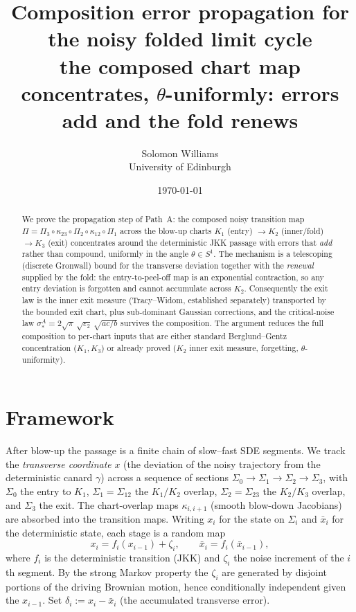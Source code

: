 \documentclass[11pt]{article}
\title{\textbf{Composition error propagation for the noisy folded limit cycle}\\[2pt]
\large the composed chart map concentrates, $\theta$-uniformly: errors add and the fold
renews}
\author{Solomon Williams \\ \small University of Edinburgh}
\date{\today}
\theoremstyle{definition}
\theoremstyle{remark}
\begin{document}
\maketitle

\begin{abstract}\noindent
We prove the propagation step of Path~A: the composed noisy transition map
$\Pi=\Pi_3\circ\kappa_{23}\circ\Pi_2\circ\kappa_{12}\circ\Pi_1$ across the blow-up charts
$K_1$ (entry) $\to K_2$ (inner/fold) $\to K_3$ (exit) concentrates around the
deterministic JKK passage with errors that \emph{add} rather than compound, uniformly in
the angle $\theta\in S^1$. The mechanism is a telescoping (discrete Gronwall) bound for
the transverse deviation together with the \emph{renewal} supplied by the fold: the
entry-to-peel-off map is an exponential contraction, so any entry deviation is forgotten
and cannot accumulate across $K_2$. Consequently the exit law is the inner exit measure
(Tracy--Widom, established separately) transported by the bounded exit chart, plus
sub-dominant Gaussian corrections, and the critical-noise law
$\sigma_*^A=2\sqrt\pi\,\sqrt{\varepsilon_2}\,\sqrt{ac/b}$ survives the composition. The
argument reduces the full composition to per-chart inputs that are either standard
Berglund--Gentz concentration ($K_1,K_3$) or already proved ($K_2$ inner exit measure,
forgetting, $\theta$-uniformity).
\end{abstract}

\section{Framework}

After blow-up the passage is a finite chain of slow--fast SDE segments. We track the
\emph{transverse coordinate} $x$ (the deviation of the noisy trajectory from the
deterministic canard $\gamma$) across a sequence of sections
$\Sigma_0\to\Sigma_1\to\Sigma_2\to\Sigma_3$, with $\Sigma_0$ the entry to $K_1$,
$\Sigma_1=\Sigma_{12}$ the $K_1/K_2$ overlap, $\Sigma_2=\Sigma_{23}$ the $K_2/K_3$
overlap, and $\Sigma_3$ the exit. The chart-overlap maps $\kappa_{i,i+1}$ (smooth
blow-down Jacobians) are absorbed into the transition maps. Writing $x_i$ for the state
on $\Sigma_i$ and $\bar x_i$ for the deterministic state, each stage is a random map
\begin{equation}\label{eq:stage}
  x_i=f_i(x_{i-1})+\zeta_i,\qquad \bar x_i=f_i(\bar x_{i-1}),
\end{equation}
where $f_i$ is the deterministic transition (JKK) and $\zeta_i$ the noise increment of
the $i$th segment. By the strong Markov property the $\zeta_i$ are generated by disjoint
portions of the driving Brownian motion, hence conditionally independent given the
$x_{i-1}$. Set $\delta_i:=x_i-\bar x_i$ (the accumulated transverse error).
\end{document}
